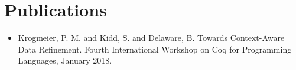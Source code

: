 \documentclass[10pt,a4paper,sans]{moderncv}        %
\begin{document}



\section{Publications}

\vspace{4pt}
\begin{itemize}
\item[] Krogmeier, P. M. and Kidd, S. and Delaware, B. Towards
  Context-Aware Data Refinement. Fourth International Workshop on Coq
  for Programming Languages, January 2018.
\end{itemize}
\end{document}
